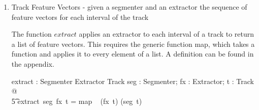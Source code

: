 \documentclass[11pt]{article}
\begin{document}
\begin{enumerate}
\begin{schema}{FeatureExtractors}
	featureextractors : Feature \pfun (\power Extractor) \\
	features : \power Feature \\
	extractors : \power Extractor \\
\where
	\dom featureextractors = features \\
	\bigcup (\ran featureextractors) = extractors \\
	\forall f : Feature ; e :  Extractor ; t : Track; i : Interval \\
	\t1 @ e \in featureextractors(f)  \implies  \\
	\t2 f.fdimension = dimension (e~ t ~ i) \\
\end{schema}

The range of the real contained in the bel unit vector is less than 0. 

\begin{zed}
		\forall t : Track; int : Interval; ux : BelUnitExtractor   @  \\
		\t5 head (ux~t~int)  
\end{zed}

\item \textsf{Track Feature Vectors} - given a segmenter and an extractor the  sequence of feature vectors  for each interval of the track 

\begin{flushright}
  \begin{tikzpicture}
    
  \end{tikzpicture}
\end{flushright}

The function $extract$ applies an extractor to each interval of a track to return a list of feature vectors. This  requires  the generic function  map, which takes a function and applies it to every element of a list. A definition can be found in the appendix. 


\begin{axdef}
extract : Segmenter \fun Extractor \fun Track \fun \seq \FV
\where
\forall seg : Segmenter; fx : Extractor; t : Track @ \\
\t5  extract~seg~fx~t = map ~ (fx~t) (seg~t)
\end{axdef}  



\end{enumerate}
\end{document}
